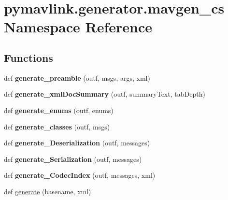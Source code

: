 \hypertarget{namespacepymavlink_1_1generator_1_1mavgen__cs}{}\section{pymavlink.\+generator.\+mavgen\+\_\+cs Namespace Reference}
\label{namespacepymavlink_1_1generator_1_1mavgen__cs}
\subsection*{Functions}
\begin{DoxyCompactItemize}
\item 
\mbox{\label{namespacepymavlink_1_1generator_1_1mavgen__cs_a92544b954c0e791aafb1d03d768e0c13}} 
def {\bfseries generate\+\_\+preamble} (outf, msgs, args, xml)
\item 
\mbox{\label{namespacepymavlink_1_1generator_1_1mavgen__cs_a9915c2abe90b770671bcb76ff7752a9a}} 
def {\bfseries generate\+\_\+xml\+Doc\+Summary} (outf, summary\+Text, tab\+Depth)
\item 
\mbox{\label{namespacepymavlink_1_1generator_1_1mavgen__cs_a5ed1c57295dc34129fd7f4d80f2a8b25}} 
def {\bfseries generate\+\_\+enums} (outf, enums)
\item 
\mbox{\label{namespacepymavlink_1_1generator_1_1mavgen__cs_a07bde4c2a35f369eeeda973364b5ef19}} 
def {\bfseries generate\+\_\+classes} (outf, msgs)
\item 
\mbox{\label{namespacepymavlink_1_1generator_1_1mavgen__cs_a85f6d78f3a8f11400ba3d9be4e4ce405}} 
def {\bfseries generate\+\_\+\+Deserialization} (outf, messages)
\item 
\mbox{\label{namespacepymavlink_1_1generator_1_1mavgen__cs_a1b4c53af7bc25e5cb3f2a3d2e67deeee}} 
def {\bfseries generate\+\_\+\+Serialization} (outf, messages)
\item 
\mbox{\label{namespacepymavlink_1_1generator_1_1mavgen__cs_a0786f1048124c0599ae8ddf33077a201}} 
def {\bfseries generate\+\_\+\+Codec\+Index} (outf, messages, xml)
\item 
def \hyperlink{namespacepymavlink_1_1generator_1_1mavgen__cs_a401ce8f84466bcf2b9247fab7f057fd2}{generate} (basename, xml)
\end{DoxyCompactItemize}
